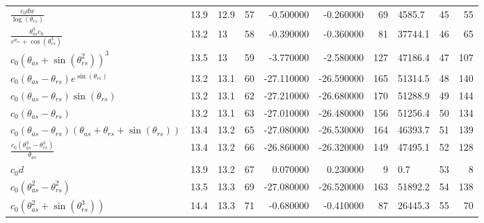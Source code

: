 \begin{tabularx}{\textwidth}{lllrrrrlrr}
$ \displaystyle\frac{c_{0} d w}{\log{\left(\theta_{rs} \right)}} $  &  13.9  &  12.9  &  57  &  -0.500000  &  -0.260000  &  69  &  4585.7  &  45\phantom{.000000}  &  55\phantom{.000000}  \\ 
$ \displaystyle\frac{\theta_{as}^{3} c_{0}}{e^{\theta_{rs}} + \cos{\left(\theta_{rs}^{3} \right)}} $  &  13.2  &  13\phantom{.0}  &  58  &  -0.390000  &  -0.360000  &  81  &  37744.1  &  46\phantom{.000000}  &  65\phantom{.000000}  \\ 
$ c_{0} \left(\theta_{as} + \sin{\left(\theta_{rs}^{2} \right)}\right)^{3} $  &  13.5  &  13\phantom{.0}  &  59  &  -3.770000  &  -2.580000  &  127  &  47186.4  &  47\phantom{.000000}  &  107\phantom{.000000}  \\ 
$ c_{0} \left(\theta_{as} - \theta_{rs}\right) e^{\sin{\left(\theta_{rs} \right)}} $  &  13.2  &  13.1  &  60  &  -27.110000  &  -26.590000  &  165  &  51314.5  &  48\phantom{.000000}  &  140\phantom{.000000}  \\ 
$ c_{0} \left(\theta_{as} - \theta_{rs}\right) \sin{\left(\theta_{rs} \right)} $  &  13.2  &  13.1  &  62  &  -27.210000  &  -26.680000  &  170  &  51288.9  &  49\phantom{.000000}  &  144\phantom{.000000}  \\ 
$ c_{0} \left(\theta_{as} - \theta_{rs}\right) $  &  13.2  &  13.1  &  63  &  -27.010000  &  -26.480000  &  156  &  51256.4  &  50\phantom{.000000}  &  134\phantom{.000000}  \\ 
$ c_{0} \left(\theta_{as} - \theta_{rs}\right) \left(\theta_{as} + \theta_{rs} + \sin{\left(\theta_{rs} \right)}\right) $  &  13.4  &  13.2  &  65  &  -27.080000  &  -26.530000  &  164  &  46393.7  &  51\phantom{.000000}  &  139\phantom{.000000}  \\ 
$ \displaystyle\frac{c_{0} \left(\theta_{as}^{3} - \theta_{rs}^{3}\right)}{\theta_{as}} $  &  13.4  &  13.2  &  66  &  -26.860000  &  -26.320000  &  149  &  47495.1  &  52\phantom{.000000}  &  128\phantom{.000000}  \\ 
$ c_{0} d $  &  13.9  &  13.2  &  67  &  0.070000  &  0.230000  &  9  &  0.7  &  53\phantom{.000000}  &  8\phantom{.000000}  \\ 
$ c_{0} \left(\theta_{as}^{2} - \theta_{rs}^{2}\right) $  &  13.5  &  13.3  &  69  &  -27.080000  &  -26.520000  &  163  &  51892.2  &  54\phantom{.000000}  &  138\phantom{.000000}  \\ 
$ c_{0} \left(\theta_{as}^{2} + \sin{\left(\theta_{rs}^{3} \right)}\right) $  &  14.4  &  13.3  &  71  &  -0.680000  &  -0.410000  &  87  &  26445.3  &  55\phantom{.000000}  &  70\phantom{.000000}  \\ 

\end{tabularx}
